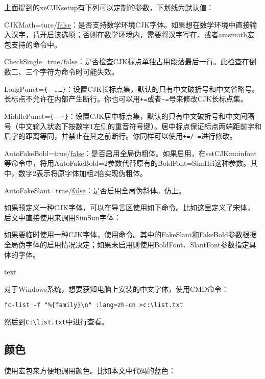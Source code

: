 上面提到的xeCJKsetup有下列可以定制的参数，下划线为默认值：
\begin{feai}
\item CJKMath=ture/\uline{false}：是否支持数学环境CJK字体。如果想在数学环境中直接输入汉字，请开启该选项；否则在数学环境内，需要将汉字写在、或者amsmath宏包支持的命令中。
\item CheckSingle=true/\uline{false}：是否检查CJK标点单独占用段落最后一行。此检查在倒数二、三个字符为命令时可能失效。
\item LongPunct=\verb|{——……}|：设置CJK长标点集，默认的只有中文破折号和中文省略号。长标点不允许在内部产生断行。你也可以用\texttt{+=}或者\texttt{-=}号来修改CJK长标点集。
\item MiddlePunct=\verb|{——·}|：设置CJK居中标点集，默认的只有中文破折号和中文间隔号（中文输入状态下按数字1左侧的重音符号键）。居中标点保证标点两端距前字和后字的距离等同，并禁止在其之前断行。你同样可以使用\texttt{+=/-=}进行修改。
\item AutoFakeBold=true/\uline{false}：是否启用全局伪粗体。如果启用，在setCJKmainfont等命令中，将用AutoFakeBold=2参数代替原有的BoldFont=SimHei这种参数。其中，数字2表示将原字体加粗2倍实现伪粗体。
\item AutoFakeSlant=true/\uline{false}：是否启用全局伪斜体。仿上。
\end{feai}

如果预定义一种CJK字体，可以在导言区使用如下命令。比如这里定义了宋体，后文中直接使用来调用SimSun字体：
\begin{latex}
\newCJKfontfamily[song]
\end{latex}


如果要临时使用一种CJK字体，使用命令。其中的FakeSlant和FakeBold参数根据全局伪字体的启用情况决定；如果未启用则使用BoldFont、SlantFont参数指定具体的字体。
\begin{latex}
{ text}
\end{latex}

对于Windows系统，想要获知电脑上安装的中文字体，使用CMD命令：
\begin{verbatim}
fc-list -f "%{family}\n" :lang=zh-cn >c:\list.txt
\end{verbatim}

然后到\verb|C:\list.txt|中进行查看。

\subsection{颜色}
使用宏包来方便地调用颜色。比如本文中代码的蓝色：
\begin{latex}
\usepackage{xcolor}
{}
\end{latex}

